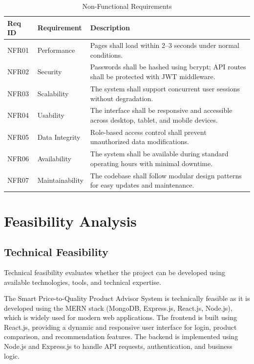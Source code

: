 \begin{table}[H]
\centering
\small
\renewcommand{\arraystretch}{1.3}
\begin{tabular}{|p{1.5cm}|p{3.5cm}|p{7.5cm}|}
    \hline
    \textbf{Req ID} & \textbf{Requirement} & \textbf{Description} \\
    \hline
    NFR01 & Performance & Pages shall load within 2--3 seconds under normal conditions. \\
    \hline
    NFR02 & Security & Passwords shall be hashed using bcrypt; API routes shall be protected with JWT middleware. \\
    \hline
    NFR03 & Scalability & The system shall support concurrent user sessions without degradation. \\
    \hline
    NFR04 & Usability & The interface shall be responsive and accessible across desktop, tablet, and mobile devices. \\
    \hline
    NFR05 & Data Integrity & Role-based access control shall prevent unauthorized data modifications. \\
    \hline
    NFR06 & Availability & The system shall be available during standard operating hours with minimal downtime. \\
    \hline
    NFR07 & Maintainability & The codebase shall follow modular design patterns for easy updates and maintenance. \\
    \hline
\end{tabular}
\caption{Non-Functional Requirements}
\label{tab:nonfunctional_req}
\end{table}

 \section{Feasibility Analysis}
 
 \subsection{Technical Feasibility}

 Technical feasibility evaluates whether the project can be developed using available technologies, tools, and technical expertise.

The Smart Price-to-Quality Product Advisor System is technically feasible as it is developed using the MERN stack (MongoDB, Express.js, React.js, Node.js), which is widely used for modern web applications. The frontend is built using React.js, providing a dynamic and responsive user interface for login, product comparison, and recommendation features. The backend is implemented using Node.js and Express.js to handle API requests, authentication, and business logic.

